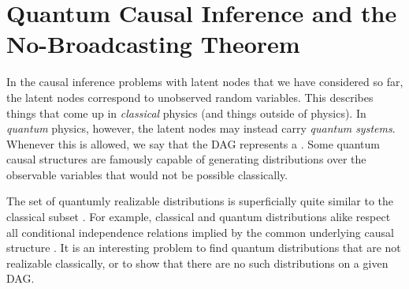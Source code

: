 \section{Quantum Causal Inference and the No-Broadcasting Theorem}\label{sec:classicallity}

In the causal inference problems with latent nodes that we have considered so far, the latent nodes correspond to unobserved random variables. This describes things that come up in \emph{classical} physics (and things outside of physics). In \emph{quantum} physics, however, the latent nodes may instead carry \emph{quantum systems}. Whenever this is allowed, we say that the DAG represents a . Some quantum causal structures are famously capable of generating distributions over the observable variables that would not be possible classically.

The set of quantumly realizable distributions is superficially quite similar to the classical subset \cite{pusey2014gdag,fritz2012bell}. For example, classical and quantum distributions alike respect all conditional independence relations implied by the common underlying causal structure \cite{pusey2014gdag}. It is an interesting problem to find quantum distributions that are not realizable classically, or to show that there are no such distributions on a given DAG.

